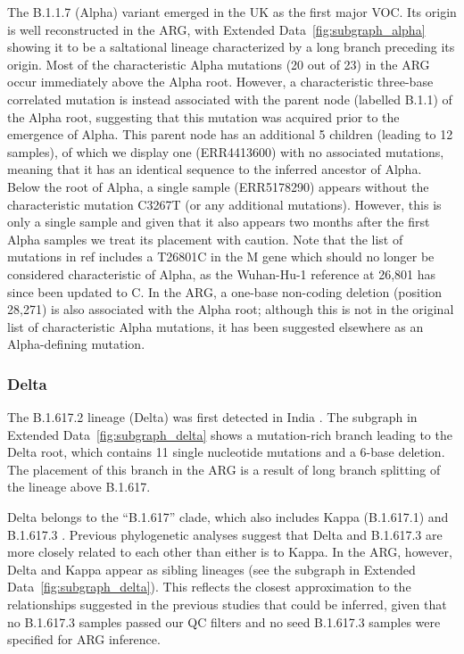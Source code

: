 \documentclass[12pt]{article}
\newcommand{\edref}[1]{Extended Data~\ref{#1}}
\begin{document}
The B.1.1.7 (Alpha) variant emerged in the UK as the first major VOC.
Its origin is well reconstructed in the ARG,
with \edref{fig:subgraph_alpha}
showing it to be a saltational lineage
characterized by a long branch preceding its origin.
Most of the characteristic Alpha mutations \cite{RambautAlpha2020}
(20 out of 23) in the ARG
occur immediately above the Alpha root.
However, a characteristic three-base correlated mutation
is instead associated with the parent node (labelled B.1.1) of the Alpha root,
suggesting that this mutation was acquired prior to the emergence of Alpha.
This parent node has an additional 5 children
(leading to 12 samples),
of which we display one (ERR4413600)
with no associated mutations,
meaning that it has an identical sequence
to the inferred ancestor of Alpha.
Below the root of Alpha, a single sample (ERR5178290)
appears without the characteristic mutation C3267T
(or any additional mutations).
However, this is only a single sample and
given that it also appears two months after the first Alpha samples
we treat its placement with caution.
Note that the list of mutations in ref\cite{RambautAlpha2020}
includes a T26801C in the M gene
which should no longer be considered characteristic of Alpha,
as the Wuhan-Hu-1 reference at 26,801 has since been updated to C.
In the ARG, a one-base non-coding deletion (position 28,271)
is also associated with the Alpha root;
although this is not in the original list of
characteristic Alpha mutations,
it has been suggested elsewhere as an Alpha-defining
mutation\cite{Li2023indels}.

\subsubsection{Delta}
\label{sec:dd_delta}

The B.1.617.2 lineage (Delta) was first detected in India \cite{ECDCreport}.
The subgraph in \edref{fig:subgraph_delta} shows
a mutation-rich branch leading to the Delta root,
which contains 11 single nucleotide mutations and a 6-base deletion.
The placement of this branch in the ARG
is a result of long branch splitting of the lineage above B.1.617.

Delta belongs to the ``B.1.617'' clade,
which also includes Kappa (B.1.617.1) and B.1.617.3 \cite{ECDCreport}.
Previous phylogenetic analyses suggest that
Delta and B.1.617.3 are more closely related to each other
than either is to Kappa\cite{Cherian2021,Farinholt2021}.
In the ARG, however, Delta and Kappa appear as sibling lineages
(see the subgraph in \edref{fig:subgraph_delta}).
This reflects the closest approximation to the relationships
suggested in the previous studies that could be inferred,
given that no B.1.617.3 samples passed our QC filters and
no seed B.1.617.3 samples were specified for ARG inference.
\end{document}
